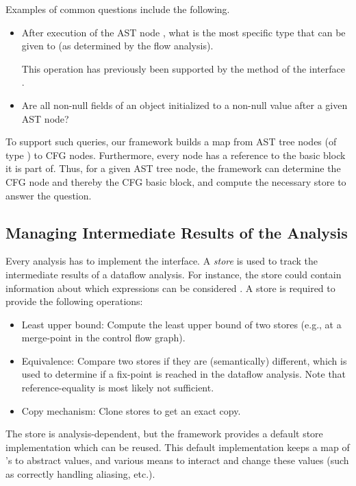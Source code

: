 Examples of common questions include the following.
\begin{itemize}
    \item After execution of the AST node , what is the most
    specific type that can be given to  (as determined by the flow analysis).
    \begin{workinprogress}
    This operation has previously been supported by the  method
    of the interface .
    \end{workinprogress}
    \item Are all non-null fields of an object initialized to a non-null value
    after a given AST node?
\end{itemize}

To support such queries, our framework builds a map from AST tree nodes (of type
) to CFG nodes. Furthermore, every node has a reference
to the basic block it is part of. Thus, for a given AST tree node, the framework
can determine the CFG node and thereby the CFG basic block, and compute the necessary store
to answer the question.

\subsection{Managing Intermediate Results of the Analysis}

Every analysis has to implement the  interface. A \emph{store} is
used to track the intermediate results of a dataflow analysis. For instance, the store
could contain information about which expressions can be considered .
A store is required to provide the following operations:
\begin{itemize}
\item Least upper bound: Compute the least upper bound of two stores (e.g., at a merge-point
in the control flow graph).
\item Equivalence: Compare two stores if they are (semantically) different, which is used
to determine if a fix-point is reached in the dataflow analysis. Note that reference-equality
is most likely not sufficient.
\item Copy mechanism: Clone stores to get an exact copy.
\end{itemize}
The store is analysis-dependent, but the framework provides a default store implementation
which can be reused.
This default implementation keeps a map of 's to abstract values, and various means
to interact and change these values (such as correctly handling aliasing, etc.).

